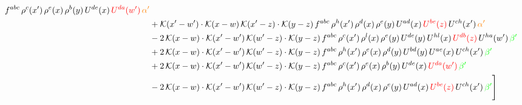 \documentclass[9pt]{article}
\numberwithin{equation}{section}
\begin{document}
\begin{align}
f^{abc}\,\rho^{c}(x')\,\rho^{e}(x)\,\rho^{b}(y)\,U^{de}(x)\,{\color{red}U^{da}(w')}\,{\color{orange} \alpha'}\notag\\ & +\mathcal{K}(x'-w')\cdot\mathcal{K}(x-w)\,\mathcal{K}(x'-z)\cdot\mathcal{K}(y-z)\, f^{abc}\,\rho^{h}(x')\,\rho^{d}(x)\,\rho^{e}(y)\,U^{ad}(x)\,{\color{red}U^{be}(z)}\,U^{ch}(x')\,{\color{orange} \alpha'}\notag\\ & -2\,\mathcal{K}(x-w)\cdot\mathcal{K}(x'-w')\,\mathcal{K}(w'-z)\cdot\mathcal{K}(y-z)\, f^{abc}\,\rho^{c}(x')\,\rho^{l}(x)\,\rho^{e}(y)\,U^{de}(y)\,U^{hl}(x)\,{\color{red}U^{db}(z)}\,U^{ha}(w')\,{\color{green} \beta'}\notag\\ &+2\,\mathcal{K}(x-w)\cdot\mathcal{K}(x'-w')\,\mathcal{K}(w'-z)\cdot\mathcal{K}(y-z)\, f^{abc}\,\rho^{h}(x')\,\rho^{e}(x)\,\rho^{d}(y)\,U^{bd}(y)\,U^{ae}(x)\,U^{ch}(x')\,{\color{green} \beta'}\notag\\ &+2\,\mathcal{K}(x-w)\cdot\mathcal{K}(x'-w')\,\mathcal{K}(w'-z)\cdot\mathcal{K}(y-z)\, f^{abc}\,\rho^{c}(x')\,\rho^{e}(x)\,\rho^{b}(y)\,U^{de}(x)\,{\color{red}U^{da}(w')}\,{\color{green} \beta'}\notag\\ & -2\,\mathcal{K}(x-w)\cdot\mathcal{K}(x'-w')\,\mathcal{K}(w'-z)\cdot\mathcal{K}(y-z)\, f^{abc}\,\rho^{h}(x')\,\rho^{d}(x)\,\rho^{e}(y)\,U^{ad}(x)\,{\color{red}U^{be}(z)}\,U^{ch}(x')\,{\color{green} \beta'}\Bigg] 
\end{align}     
\end{document}
